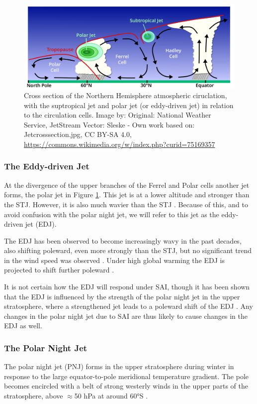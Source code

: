 \begin{figure}[t]
    \centering
    \includegraphics[width=0.8\linewidth]{images/Jetcrosssection.png}
    \caption{Cross section of the Northern Hemisphere atmospheric ciruclation, with the suptropical jet and polar jet (or eddy-driven jet) in relation to the circulation cells. Image by: Original: National Weather Service, JetStream Vector: Sleske - Own work based on: Jetcrosssection.jpg, CC BY-SA 4.0, \href{https://commons.wikimedia.org/w/index.php?curid=75169357}{https://commons.wikimedia.org/w/index.php?curid=75169357}}  
    \label{fig:jetcrosssection}  
\end{figure}


\subsubsection{The Eddy-driven Jet}
At the divergence of the upper branches of the Ferrel and Polar cells another jet forms, the polar jet in Figure \ref{fig:jetcrosssection}. This jet is at a lower altitude and stronger than the STJ. However, it is also much wavier than the STJ \parencite{martin2023}. Because of this, and to avoid confusion with the polar night jet, we will refer to this jet as the eddy-driven jet (EDJ). 

The EDJ has been observed to become increasingly wavy in the past decades, also shifting poleward, even more strongly than the STJ, but no significant trend in the wind speed was observed \parencite{martin2023}. Under high global warming the EDJ is projected to shift further poleward \parencite{Curtis_2020}.

It is not certain how the EDJ will respond under SAI, though it has been shown that the EDJ is influenced by the strength of the polar night jet in the upper stratosphere, where a strengthened jet leads to a poleward shift of the EDJ \parencite{kidston2015stratospheric}. Any changes in the polar night jet due to SAI are thus likely to cause changes in the EDJ as well.

\subsubsection{The Polar Night Jet}
The polar night jet (PNJ) forms in the upper stratosphere during winter in response to the large equator-to-pole meridional temperature gradient. The pole becomes encircled with a belt of strong westerly winds in the upper parts of the stratosphere, above $\approx$50 hPa at around 60°S \parencite{lee2021}. 

